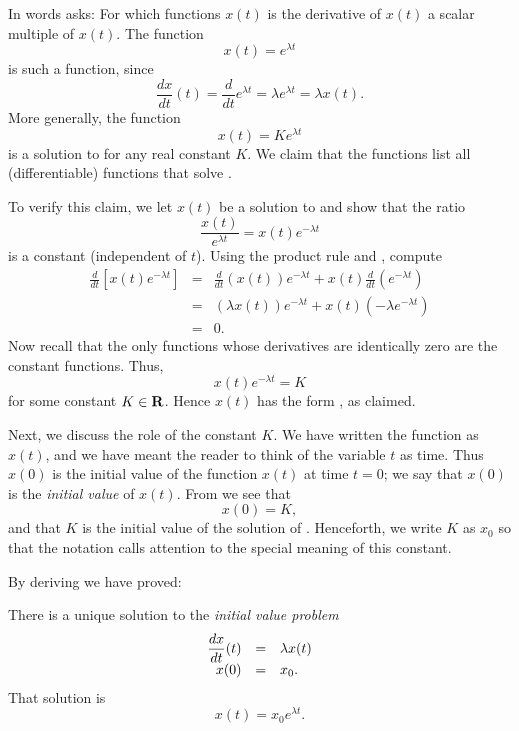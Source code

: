 In words  asks: For which functions $x(t)$ is the
derivative of $x(t)$ a scalar multiple of $x(t)$.  The function
\[
x(t)=e^{\lambda t}
\]
is such a function, since
\[
\frac{dx}{dt}(t) = \frac{d}{dt}e^{\lambda t} =
\lambda e^{\lambda t} = \lambda x(t).
\]
More generally, the function
\begin{equation} \label{soln1}
x(t) = K e^{\lambda t}
\end{equation}
is a solution to  for any real constant $K$.  We claim
that the functions  list all (differentiable)
functions that solve .

To verify this claim, we let $x(t)$ be a solution to 
and show that the ratio 
\[
\frac{x(t)}{e^{\lambda t}} = x(t)e^{-\lambda t}
\]
is a constant (independent of $t$).  Using the product rule 
 and , compute
\begin{eqnarray*}
\frac{d}{dt}\left[x(t)e^{-\lambda t}\right] & = &
\frac{d}{dt}\left(x(t)\right) e^{-\lambda t} +
x(t)\frac{d}{dt}\left(e^{-\lambda t}\right) \\
& = &
(\lambda x(t)) e^{-\lambda t} + x(t)(-\lambda e^{-\lambda t}) \\
& = & 0.
\end{eqnarray*}
Now recall that the only functions whose derivatives are
identically zero are the constant functions.  Thus,
\[
x(t) e^{-\lambda t} = K
\]
for some constant $K\in\mbox{$\bf{R}$}$.  Hence $x(t)$ has the form
, as claimed.

Next, we discuss the role of the constant $K$.  We have written
the function as $x(t)$, and we have meant the reader to think of
the variable $t$ as time.  Thus $x(0)$ is the initial value of
the function $x(t)$ at time $t=0$; we say that $x(0)$ is the
{\em initial value\/} of $x(t)$.
From  we see that
\[
x(0) = K,
\]
and that $K$ is the initial value of the solution of .
Henceforth, we write $K$ as $x_0$ so that the notation calls
attention to the special meaning of this constant.

By deriving  we have proved:
\begin{thm}  \label{T:singleeqn}
There is a unique solution to the {\em initial value problem\/}
\arraystart
\begin{equation} \label{ivp1}
\begin{array}{rcl}
\displaystyle \frac{dx}{dt}(t) & = & \lambda x(t) \\
x(0) & = & x_0.
\end{array}
\end{equation}
\arrayfinish
That solution is
\[
x(t) = x_0e^{\lambda t}.
\]
\end{thm}

